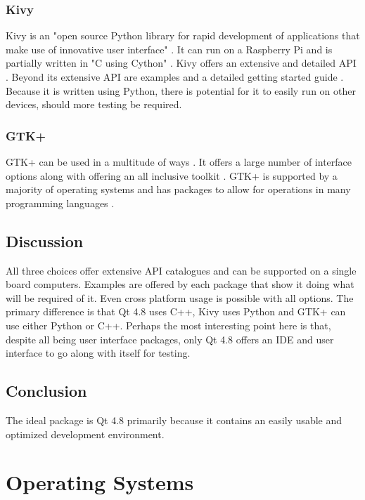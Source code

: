 \documentclass[onecolumn, draftclsnofoot,10pt, compsoc]{IEEEtran}
\begin{document}
\subsubsection{Kivy}

Kivy is an "open source Python library for rapid development of applications that make use of innovative user interface" \cite{Kivy:home}. It can run on a Raspberry Pi and is partially written in "C using Cython" \cite{Kivy:home}. Kivy offers an extensive and detailed API \cite{Kivy:API}. Beyond its extensive API are examples and a detailed getting started guide \cite{Kivy:intro}. Because it is written using Python, there is potential for it to easily run on other devices, should more testing be required.

\subsubsection{GTK+}

GTK+ can be used in a multitude of ways \cite{GTK:intro}. It offers a large number of interface options along with offering an all inclusive toolkit \cite{GTK:features}. GTK+ is supported by a majority of operating systems and has packages to allow for operations in many programming languages \cite{GTK:features}.

\subsection{Discussion}

All three choices offer extensive API catalogues and can be supported on a single board computers. Examples are offered by each package that show it doing what will be required of it. Even cross platform usage is possible with all options. The primary difference is that Qt 4.8 uses C++, Kivy uses Python and GTK+ can use either Python or C++. Perhaps the most interesting point here is that, despite all being user interface packages, only Qt 4.8 offers an IDE and user interface to go along with itself for testing.

\subsection{Conclusion}

The ideal package is Qt 4.8 primarily because it contains an easily usable and optimized development environment.


\section{Operating Systems}
\end{document}
